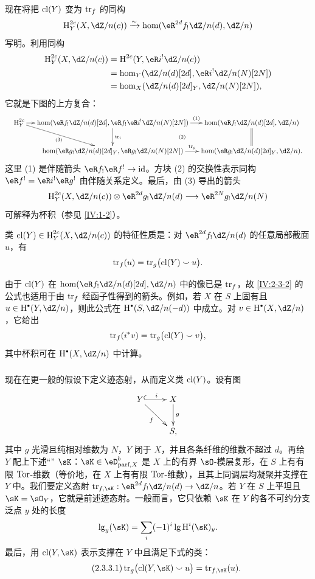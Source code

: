 现在将把 $\operatorname{cl}(Y)$ 变为 $\operatorname{tr}_f$ 的同构
\[
\h_Y^{2c}(X,\dZ/n(c))\iso\hom(\eR^{2d}f_!\dZ/n(d),\dZ/n)
\]
写明。利用同构
\begin{align*}
\h_Y^{2c}(X,\dZ/n(c))
&=\h^{2c}(Y,\eR i^!\dZ/n(c))\\
&=\hom_Y(\dZ/n(d)[2d],\eR i^!\dZ/n(N)[2N])\\
&=\hom_X(\dZ/n(d)[2d]_Y,\dZ/n(N)[2N]),
\end{align*}
它就是下图的上方复合：
\[
\resizebox{\linewidth}{!}{$\xymatrix@C=12pt{
\h_Y^{2c}\ar[r]\ar[dr]_-{(3)}&
\hom(\eR f_!\dZ/n(d)[2d],\eR f_!\eR i^!\dZ/n(N)[2N])\ar[r]^-{(1)}\ar[d]^-{\tr_i}\ar@{}[dr]|-{(2)}&
\hom(\eR f_!\dZ/n(d)[2d],\dZ/n)\ar@{=}[d]\\
&\hom(\eR g_!\dZ/n(d)[2d]_Y,\eR g_!\dZ/n(N)[2N])\ar[r]^-{\tr_g}&
\hom(\eR g_!\dZ/n(d)[2d]_Y,\dZ/n).
}$}
\]
这里 (1) 是伴随箭头 $\eR f_!\eR f^!\to\mathrm{id}$。方块 (2) 的交换性表示同构 $\eR f^!=\eR i^!\eR g^!$ 由伴随关系定义。最后，由 (3) 导出的箭头
\[
\h_Y^{2c}(X,\dZ/n(c))\otimes\eR^{2d}g_!\dZ/n(d)
\longrightarrow\eR^{2N}g_!\dZ/n(N)
\]
可解释为杯积（参见 \ref{IV:1-2}）。

\begin{definition}\label{IV:2-3-2}
类 $\cl(Y)\in\h_Y^{2c}(X,\dZ/n(c))$ 的特征性质是：对 $\eR^{2d}f_!\dZ/n(d)$ 的任意局部截面 $u$，有
\[
\operatorname{tr}_f(u)=\operatorname{tr}_g\bigl(\operatorname{cl}(Y)\smallsmile u\bigr).
\]
\end{definition}
由于 $\operatorname{cl}(Y)$ 在 $\hom(\eR f_!\dZ/n(d)[2d],\dZ/n)$ 中的像已是 $\operatorname{tr}_f$，故 \ref{IV:2-3-2} 的公式也适用于由 $\operatorname{tr}_f$ 经函子性得到的箭头。例如，若 $X$ 在 $S$ 上固有且 $u\in\h^\bullet(Y,\dZ/n)$，则此公式在 $\h^\bullet(S,\dZ/n(-d))$ 中成立。对 $v\in\h^\bullet(X,\dZ/n)$，它给出
\[
\operatorname{tr}_f(i^*v)=\operatorname{tr}_g\bigl(\operatorname{cl}(Y)\smallsmile v\bigr),
\]
其中杯积可在 $\h^\bullet(X,\dZ/n)$ 中计算。

\subsubsection{}\label{IV:2-3-3}
现在在更一般的假设下定义迹态射，从而定义类 $\operatorname{cl}(Y)$。设有图
\[\xymatrix{Y\ar@{^{(}->}[r]^-i\ar[dr]_-f&X\ar[d]^-g\\&S,}\]
其中 $g$ 光滑且纯相对维数为 $N$，$Y$ 闭于 $X$，并且各条纤维的维数不超过 $d$。再给 $Y$ 配上下述“” $\sK$：$\sK\in\eD_{\text{parf},X}^b$ 是 $X$ 上的有界 $\sO$-模层复形，在 $S$ 上有有限 $\operatorname{Tor}$-维数（等价地，在 $X$ 上有有限 $\operatorname{Tor}$-维数），且其上同调层均凝聚并支撑在 $Y$ 中。我们要定义态射 $\tr_{f,\sK}:\eR^{2d}f_!\dZ/n(d)\to\dZ/n$。若 $Y$ 在 $S$ 上平坦且 $\sK=\sO_Y$，它就是前述迹态射。一般而言，它只依赖 $\sK$ 在 $Y$ 的各不可约分支泛点 $y$ 处的长度
\[
\operatorname{lg}_y(\sK)=\sum_i(-1)^i\operatorname{lg}\h^i(\sK)_y.
\]
最后，用 $\cl(Y,\sK)$ 表示支撑在 $Y$ 中且满足下式的类：
\begin{equation*}\tag{2.3.3.1}\label{IV:eq:2-3-3-1}
\tr_g\bigl(\cl(Y,\sK)\smallsmile u\bigr)=\tr_{f,\sK}(u).
\end{equation*}

